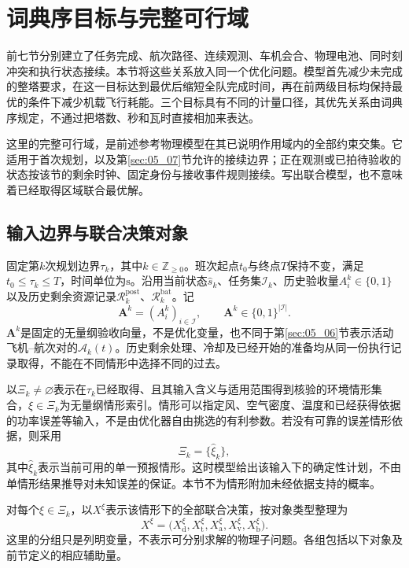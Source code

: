 \section{词典序目标与完整可行域}
\label{sec:05_08}

前七节分别建立了任务完成、航次路径、连续观测、车机会合、物理电池、同时刻冲突和执行状态接续。本节将这些关系放入同一个优化问题。模型首先减少未完成的整塔要求，在这一目标达到最优后缩短全队完成时间，再在前两级目标均保持最优的条件下减少机载飞行耗能。三个目标具有不同的计量口径，其优先关系由词典序规定，不通过把塔数、秒和瓦时直接相加来表达。

这里的完整可行域，是前述参考物理模型在其已说明作用域内的全部约束交集。它适用于首次规划，以及第\ref{sec:05_07}节允许的接续边界；正在观测或已拍待验收的状态按该节的剩余时钟、固定身份与接收事件规则接续。写出联合模型，也不意味着已经取得区域联合最优解。

\subsection{输入边界与联合决策对象}

固定第$k$次规划边界$\tau_k$，其中$k\in\mathbb Z_{\ge0}$。班次起点$t_0$与终点$T$保持不变，满足$t_0\le\tau_k\le T$，时间单位为$\mathrm s$。沿用当前状态$\widehat s_k$、任务集$\mathcal I_k$、历史验收量$A_i^k\in\{0,1\}$以及历史剩余资源记录$\mathcal R_k^{\mathrm{post}}$、$\mathcal R_k^{\mathrm{bat}}$。记
\begin{equation}
 \mathbf A^k=(A_i^k)_{i\in\mathcal I},
 \qquad \mathbf A^k\in\{0,1\}^{|\mathcal I|}.
 \label{s0508:history_vector}
\end{equation}
$\mathbf A^k$是固定的无量纲验收向量，不是优化变量，也不同于第\ref{sec:05_06}节表示活动飞机--航次对的$\mathcal A_k(t)$。历史剩余处理、冷却及已经开始的准备均从同一份执行记录取得，不能在不同情形中选择不同的过去。

以$\Xi_k\ne\varnothing$表示在$\tau_k$已经取得、且其输入含义与适用范围得到核验的环境情形集合，$\xi\in\Xi_k$为无量纲情形索引。情形可以指定风、空气密度、温度和已经获得依据的功率误差等输入，不是由优化器自由挑选的有利参数。若没有可靠的误差情形依据，则采用
\begin{equation}
 \Xi_k=\{\widehat\xi_k\},
 \label{s0508:singleton_scenario}
\end{equation}
其中$\widehat\xi_k$表示当前可用的单一预报情形。这时模型给出该输入下的确定性计划，不由单情形结果推导对未知误差的保证。本节不为情形附加未经依据支持的概率。

对每个$\xi\in\Xi_k$，以$X^\xi$表示该情形下的全部联合决策，按对象类型整理为
\begin{equation}
 X^\xi=
 \bigl(X_{\mathrm d}^\xi,X_{\mathrm t}^\xi,
       X_{\mathrm a}^\xi,X_{\mathrm v}^\xi,
       X_{\mathrm b}^\xi\bigr).
 \label{s0508:decision_tuple}
\end{equation}
这里的分组只是列明变量，不表示可分别求解的物理子问题。各组包括以下对象及前节定义的相应辅助量。

